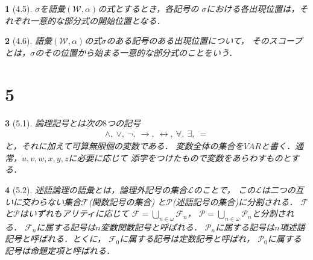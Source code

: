 \documentclass[a4j,10.5pt,oneside,openany]{jsbook}
\theoremstyle{mystyle}
\newtheorem{thm}{\color{DarkMidnightBlue}{定理}}[section]
\newtheorem{dfn}[thm]{\color{PakistanGreen}{定義}}
\begin{document}
	\begin{screen}
		\begin{thm}[4.5]
			$\sigma$を語彙$(\mathcal{W},\alpha)$の式とするとき，各記号の
			$\sigma$における各出現位置は，それぞれ一意的な部分式の開始位置となる．
		\end{thm}
	\end{screen}
	
	\begin{screen}
		\begin{dfn}[4.6]
			語彙$(\mathcal{W},\alpha)$の式$\sigma$のある記号のある出現位置について，
			そのスコープとは，$\sigma$のその位置から始まる一意的な部分式のことをいう．
		\end{dfn}
	\end{screen}
	
\section{5}
	\begin{screen}
		\begin{dfn}[5.1]
			論理記号とは次の$8$つの記号
			\begin{align}
				\wedge,\ \vee,\ \neg,\ \rightarrow,\ \leftrightarrow,\ \forall,
				\ \exists,\ =
			\end{align}
			と，それに加えて可算無限個の変数である．
			変数全体の集合を$VAR$と書く．通常，$u,v,w,x,y,z$に必要に応じて
			添字をつけたもので変数をあらわすものとする．
		\end{dfn}
	\end{screen}
	
	\begin{screen}
		\begin{dfn}[5.2]
			述語論理の語彙とは，論理外記号の集合$\mathcal{L}$のことで，
			この$\mathcal{L}$は二つの互いに交わらない集合$\mathcal{F}$(関数記号の集合)
			と$\mathcal{P}$(述語記号の集合)に分割される．
			$\mathcal{F}$と$\mathcal{P}$はいずれもアリティに応じて
			$\mathcal{F} = \bigcup_{n \in \omega} \mathcal{F}_{n}$，
			$\mathcal{P} = \bigcup_{n \in \omega} \mathcal{P}_{n}$と分割される．
			$\mathcal{F}_{n}$に属する記号は$n$変数関数記号と呼ばれる．
			$\mathcal{P}_{n}$に属する記号は$n$項述語記号と呼ばれる．とくに，
			$\mathcal{F}_{0}$に属する記号は定数記号と呼ばれ，
			$\mathcal{P}_{0}$に属する記号は命題定項と呼ばれる．
		\end{dfn}
	\end{screen}
	
\end{document}
